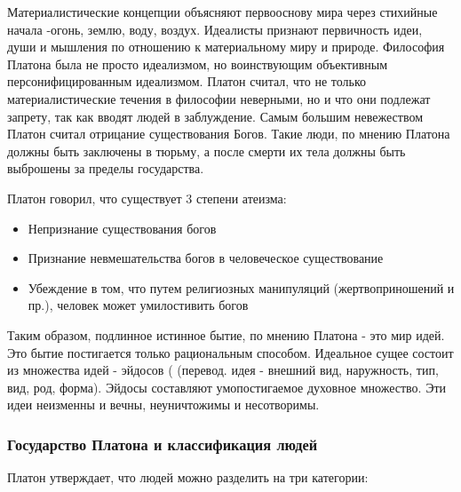 \documentclass[
]{article}
\providecommand{\tightlist}{%
  \setlength{\itemsep}{0pt}\setlength{\parskip}{0pt}}
\begin{document}
Материалистические концепции объясняют первооснову мира через стихийные
начала -огонь, землю, воду, воздух. Идеалисты признают первичность идеи,
души и мышления по отношению к материальному миру и природе. Философия
Платона была не просто идеализмом, но воинствующим объективным
персонифицированным идеализмом. Платон считал, что не только
материалистические течения в философии неверными, но и что они подлежат
запрету, так как вводят людей в заблуждение. Самым большим невежеством
Платон считал отрицание существования Богов. Такие люди, по мнению
Платона должны быть заключены в тюрьму, а после смерти их тела должны
быть выброшены за пределы государства.

Платон говорил, что существует 3 степени атеизма:

\begin{itemize}
\tightlist
\item
  Непризнание существования богов
\item
  Признание невмешательства богов в человеческое существование
\item
  Убеждение в том, что путем религиозных манипуляций (жертвоприношений и
  пр.), человек может умилостивить богов
\end{itemize}

Таким образом, подлинное истинное бытие, по мнению Платона - это мир
идей. Это бытие постигается только рациональным способом. Идеальное
сущее состоит из множества идей - эйдосов ( (перевод. идея - внешний
вид, наружность, тип, вид, род, форма). Эйдосы составляют умопостигаемое
духовное множество. Эти идеи неизменны и вечны, неуничтожимы и
несотворимы.

\hypertarget{ux433ux43eux441ux443ux434ux430ux440ux441ux442ux432ux43e-ux43fux43bux430ux442ux43eux43dux430-ux438-ux43aux43bux430ux441ux441ux438ux444ux438ux43aux430ux446ux438ux44f-ux43bux44eux434ux435ux439}{%
\subsubsection{Государство Платона и классификация
людей}\label{ux433ux43eux441ux443ux434ux430ux440ux441ux442ux432ux43e-ux43fux43bux430ux442ux43eux43dux430-ux438-ux43aux43bux430ux441ux441ux438ux444ux438ux43aux430ux446ux438ux44f-ux43bux44eux434ux435ux439}}

Платон утверждает, что людей можно разделить на три категории:
\end{document}
